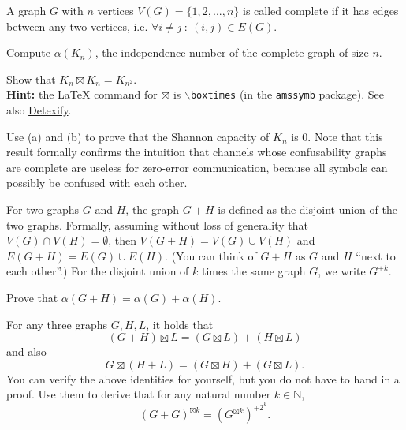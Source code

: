 \documentclass[a4paper,10pt,landscape,twocolumn]{scrartcl}
\begin{document}
\begin{exercise}
A graph $G$ with $n$ vertices $V(G) = \{1,2,...,n\}$ is called complete if it has edges between any two vertices, i.e. $\forall i \neq j \ : \ (i,j) \in E(G)$.
	\begin{subex}[(2pt)]
	Compute $\alpha(K_n)$, the independence number of the complete graph of size $n$.
	\end{subex}
	\begin{subex}[(2pt)]
	Show that $K_n \boxtimes K_n = K_{n^2}$.
	\\\textbf{Hint:} the \LaTeX{} command for $\boxtimes$ is \texttt{$\backslash$boxtimes} (in the \texttt{amssymb} package). See also \href{http://detexify.kirelabs.org/classify.html}{Detexify}.
	\end{subex}
	\begin{subex}[(2pt)]
	Use (a) and (b) to prove that the Shannon capacity of $K_n$ is 0. Note that this result formally confirms the intuition that channels whose confusability graphs are complete are useless for zero-error communication, because all symbols can possibly be confused with each other.
	\end{subex}
\end{exercise}

\begin{exercise}
For two graphs $G$ and $H$, the graph $G + H$ is defined as the disjoint union of the two graphs. Formally, assuming without loss of generality that $V(G) \cap V(H) = \emptyset$, then $V(G + H) = V(G) \cup V(H)$ and $E(G+H) = E(G) \cup E(H)$. (You can think of $G + H$ as $G$ and $H$ ``next to each other''.) For the disjoint union of $k$ times the same graph $G$, we write $G^{+k}$.
	\begin{subex}[(2pt)]
	Prove that $\alpha(G+H) = \alpha(G) + \alpha(H)$.
	\end{subex}

	\begin{subex}[(3pt)]
	For any three graphs $G,H,L$, it holds that
	\[
	(G+H) \boxtimes L = (G \boxtimes L) + (H \boxtimes L)
	\]
	and also
	\[
	G \boxtimes (H + L) = (G \boxtimes H) + (G \boxtimes L).
	\]
	You can verify the above identities for yourself, but you do not have to hand in a proof. Use them to derive that for any natural number $k \in \mathbb{N}$, \[(G + G)^{\boxtimes k} = (G^{\boxtimes k})^{+2^k}.\]
	\end{subex}
\end{exercise}
\end{document}
